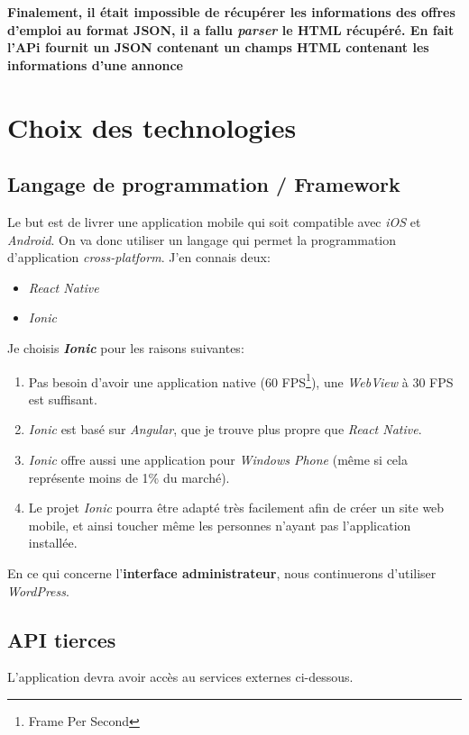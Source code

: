 \documentclass[french]{report}
\begin{document}
\textbf{Finalement, il était impossible de récupérer les informations des offres d'emploi
au format JSON, il a fallu \textit{parser} le HTML récupéré. En fait l'APi fournit un
JSON contenant un champs HTML contenant les informations d'une annonce}

\section{Choix des technologies}

\subsection{Langage de programmation / Framework}
Le but est de livrer une application mobile qui soit compatible avec \textit{iOS}
et \textit{Android}. On va donc utiliser un langage qui permet la programmation
d'application \textit{cross-platform}. J'en connais deux:
\begin{itemize}
    \item \textit{React Native}
    \item \textit{Ionic}
\end{itemize}
Je choisis \textbf{\textit{Ionic}} pour les raisons suivantes:
\begin{enumerate}
    \item Pas besoin d'avoir une application native (60 FPS\footnote{Frame Per Second}),
    une \textit{WebView} à 30 FPS est suffisant.
    \item \textit{Ionic} est basé sur \textit{Angular}, que je trouve plus \og
    propre \fg{} que \textit{React Native}.
    \item \textit{Ionic} offre aussi une application pour \textit{Windows Phone} (même si
    cela représente moins de 1\% du marché).
    \item Le projet \textit{Ionic} pourra être adapté très facilement afin de créer
    un site web mobile, et ainsi toucher même les personnes n'ayant pas l'application
    installée.
\end{enumerate}
\vspace{1em}

En ce qui concerne l'\textbf{interface administrateur}, nous continuerons d'utiliser
\textit{WordPress}.


\subsection{API tierces}

L'application devra avoir accès au services externes ci-dessous.
\end{document}
